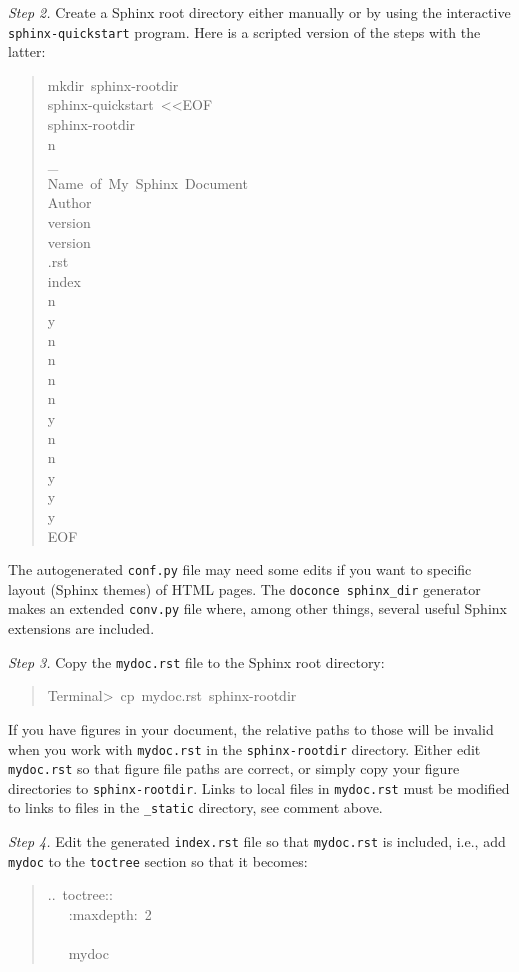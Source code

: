 \documentclass[a4paper]{article}
\begin{document}
\emph{Step 2.} Create a Sphinx root directory
either manually or by using the interactive \texttt{sphinx-quickstart}
program. Here is a scripted version of the steps with the latter:
%
\begin{quote}{\ttfamily \raggedright \noindent
mkdir~sphinx-rootdir\\
sphinx-quickstart~<{}<EOF\\
sphinx-rootdir\\
n\\
\_\\
Name~of~My~Sphinx~Document\\
Author\\
version\\
version\\
.rst\\
index\\
n\\
y\\
n\\
n\\
n\\
n\\
y\\
n\\
n\\
y\\
y\\
y\\
EOF
}
\end{quote}

The autogenerated \texttt{conf.py} file
may need some edits if you want to specific layout (Sphinx themes)
of HTML pages. The \texttt{doconce sphinx\_dir} generator makes an extended \texttt{conv.py}
file where, among other things, several useful Sphinx extensions
are included.

\emph{Step 3.} Copy the \texttt{mydoc.rst} file to the Sphinx root directory:
%
\begin{quote}{\ttfamily \raggedright \noindent
Terminal>~cp~mydoc.rst~sphinx-rootdir
}
\end{quote}

If you have figures in your document, the relative paths to those will
be invalid when you work with \texttt{mydoc.rst} in the \texttt{sphinx-rootdir}
directory. Either edit \texttt{mydoc.rst} so that figure file paths are correct,
or simply copy your figure directories to \texttt{sphinx-rootdir}.
Links to local files in \texttt{mydoc.rst} must be modified to links to
files in the \texttt{\_static} directory, see comment above.

\emph{Step 4.} Edit the generated \texttt{index.rst} file so that \texttt{mydoc.rst}
is included, i.e., add \texttt{mydoc} to the \texttt{toctree} section so that it becomes:
%
\begin{quote}{\ttfamily \raggedright \noindent
..~toctree::\\
~~~:maxdepth:~2\\
~\\
~~~mydoc
}
\end{quote}
\end{document}
